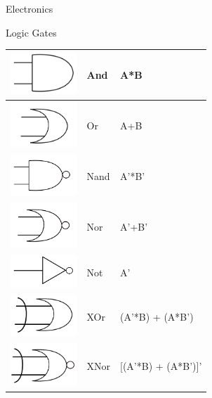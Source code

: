 \begin{section}{Electronics}
	\begin{subsection}{Logic Gates}
		\begin{tabular}{ |m{3cm}|m{3cm}|m{6cm}|  }			
		\hline 
			\rule{0pt}{50pt} \includegraphics[width = 2.5cm]{1.png} & And & A*B \\
		\hline
			\rule{0pt}{50pt} \includegraphics[width = 2.5cm]{2.png} & Or & A+B \\
		\hline
			\rule{0pt}{50pt} \includegraphics[width = 2.5cm]{3.png} & Nand & A'*B' \\
		\hline
			\rule{0pt}{50pt} \includegraphics[width = 2.5cm]{4.png} & Nor & A'+B' \\
		\hline
			\rule{0pt}{50pt} \includegraphics[width = 2.5cm]{5.png} & Not & A' \\
		\hline
			\rule{0pt}{50pt} \includegraphics[width = 2.5cm]{6.png} & XOr & (A'*B) + (A*B') \\
		\hline
			\rule{0pt}{50pt} \includegraphics[width = 2.5cm]{7.png} & XNor & [(A'*B) + (A*B')]' \\
		\hline
		

\end{tabular}
\end{subsection}
\end{section}
